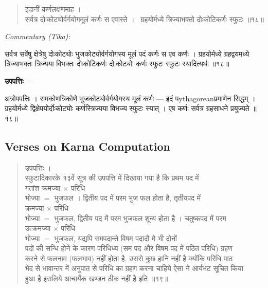 \documentclass[11pt,a4paper]{article}
\newcommand{\skt}[1]{{\devanagarifont\color{sktcolor} #1}}
\newenvironment{shloka}{%
  \begin{quote}%
  \smallskip%
  \devanagarifont\color{sktcolor}%
}{%
  \smallskip%
  \end{quote}%
}
\newenvironment{tika}{%
  \smallskip%
  \noindent\textit{Commentary (Tika):}\par%
  \smallskip%
  \hindifont\small%
}{%
  \par\smallskip%
}
\newenvironment{upapatti}{%
  \smallskip%
  \noindent\textbf{\devanagarifont उपपत्तिः} — \devanagarifont\small%
}{%
  \par\smallskip%
}
\begin{document}
\begin{shloka}
\skt{इदानीं कर्णलक्षणमाह ।}\\[0.5em]
\skt{सर्वत्र दोःकोट्योर्वर्गयोगमूलं कर्णः स एवास्ते ।}\
\skt{ग्रहयोर्मध्ये त्रिज्याभक्तो दोःकोटिकर्णः स्फुटः} ॥१८॥
\end{shloka}

\vspace{0.3cm}
\begin{tika}
\skt{सर्वत्र} सर्वेषु क्षेत्रेषु \skt{दोःकोट्योः} भुजकोट्योर्वर्गयोगस्य \skt{मूलं} पदं \skt{कर्णः} स एव कर्णः । \skt{ग्रहयोर्मध्ये} ग्रहद्वयमध्ये \skt{त्रिज्याभक्तः} त्रिज्यया विभक्तः \skt{दोःकोटिकर्णः} दोःकोट्योः कर्णः \skt{स्फुटः} स्फुटः स्यादित्यर्थः ॥१८॥
\end{tika}

\vspace{0.3cm}
\begin{upapatti}
\skt{अत्रोपपत्तिः} । समकोणत्रिकोणे भुजकोट्योर्वर्गयोगस्य मूलं कर्णः — इदं पythagoreanप्रमाणेन सिद्धम् । ग्रहयोर्मध्ये द्विक्षेपयोर्दोःकोट्योः कर्णस्त्रिज्यया विभज्य स्फुटः स्यात् । एष कर्णः सर्वत्र ग्रहसाधने प्रयुज्यते ॥१८॥
\end{upapatti}

\subsection*{Verses on Karna Computation}

\begin{shloka}
\skt{उपपत्तिः ।}\\[0.5em]
\skt{स्फुटादिकारके १३वें सूत्र की उपपत्ति में दिखाया गया है कि प्रथम पद में}\\
\skt{गतांश क्रमज्या $\times$ परिधि}\\
\skt{भोज्या} $=$ \skt{भुजफल । द्वितीय पद में परम भुज फल होता है, तृतीयपद में}\\
\skt{क्रमज्या $\times$ परिधि}\\
\skt{भोज्या} $=$ \skt{भुजफल, द्वितीय पद में परम भुजफल शून्य होता है । चतुष्कपद में परम}\\
\skt{उत्क्रमज्या $\times$ परिधि}\\
\skt{भोज्या} $=$ \skt{भुजफल, यद्यपि समपदान्ते विषम पदादौ मे भी दोनों}\\
\skt{पदों की सन्धि होने के कारण परिधिध्य (सम पद और विषम पद में पठित परिधि) ग्रहण}\\
\skt{करने से फलनाम (फलभाव) नहीं होता है, उससे कुछ हानि नहीं है क्योंकि परिधि पाठ}\\
\skt{भेद से भावान्तर में अनुपात से परिधि का ग्रहण करना चाहिये ऐसा ने आर्यभट सूचित किया}\\
\skt{हुआ है इसलिये आचार्यैक खण्डन ठीक नहीं है इति} ॥१९॥
\end{shloka}
\end{document}
